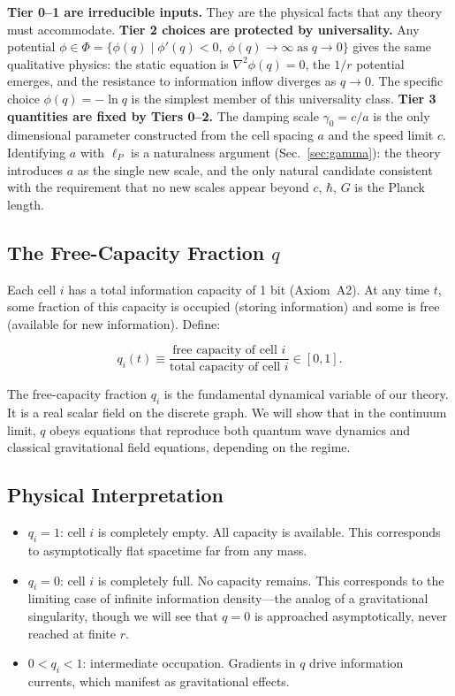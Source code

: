 \documentclass[aps,prd,twocolumn,showpacs,superscriptaddress,preprintnumbers]{revtex4-2}
\begin{document}
\textbf{Tier 0--1 are irreducible inputs.} They are the physical facts that any theory must accommodate.
\textbf{Tier 2 choices are protected by universality.} Any potential $\phi\in\Phi=\{\phi(q)\mid\phi'(q)<0,\;\phi(q)\to\infty\;\text{as}\;q\to0\}$ gives the same qualitative physics: the static equation is $\nabla^2\phi(q)=0$, the $1/r$ potential emerges, and the resistance to information inflow diverges as $q\to0$.
The specific choice $\phi(q)=-\ln q$ is the simplest member of this universality class.
\textbf{Tier 3 quantities are fixed by Tiers 0--2.} The damping scale $\gamma_0=c/a$ is the only dimensional parameter constructed from the cell spacing $a$ and the speed limit $c$.
Identifying $a$ with $\ell_P$ is a naturalness argument (Sec.~\ref{sec:gamma}): the theory introduces $a$ as the single new scale, and the only natural candidate consistent with the requirement that no new scales appear beyond $c$, $\hbar$, $G$ is the Planck length.

\subsection{The Free-Capacity Fraction $q$}

Each cell $i$ has a total information capacity of 1 bit (Axiom~A2).
At any time $t$, some fraction of this capacity is occupied (storing information) and some is free (available for new information).
Define:

\begin{equation}
q_i(t) \equiv \frac{\text{free capacity of cell } i}{\text{total capacity of cell } i} \in [0, 1].
\label{eq:qdef}
\end{equation}

The free-capacity fraction $q_i$ is the fundamental dynamical variable of our theory.
It is a real scalar field on the discrete graph.
We will show that in the continuum limit, $q$ obeys equations that reproduce both quantum wave dynamics and classical gravitational field equations, depending on the regime.

\subsection{Physical Interpretation}

\begin{itemize}
    \item $q_i = 1$: cell $i$ is completely empty. All capacity is available. This corresponds to asymptotically flat spacetime far from any mass.
    \item $q_i = 0$: cell $i$ is completely full. No capacity remains. This corresponds to the limiting case of infinite information density---the analog of a gravitational singularity, though we will see that $q=0$ is approached asymptotically, never reached at finite $r$.
    \item $0 < q_i < 1$: intermediate occupation. Gradients in $q$ drive information currents, which manifest as gravitational effects.
\end{itemize}
\end{document}
